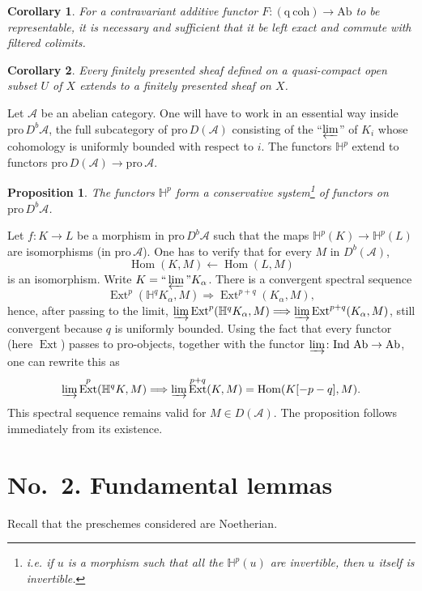 \documentclass[11pt]{amsart}
\DeclareMathOperator{\Hom}{Hom}
\DeclareMathOperator{\Ext}{Ext}
\newcommand{\Ind}{\text{Ind}\,}
\newcommand{\Pro}{\text{pro}\,}
\newcommand{\Ab}{\text{Ab}}
\newcommand{\cA}{\mathcal{A}}
\newcommand{\cDb}{D^{b}}
\newcommand{\cD}{D}
\newcommand{\bH}{\mathbb{H}}
\theoremstyle{plain}
\newtheorem{prop}{Proposition}
\newtheorem{cor}{Corollary}
\theoremstyle{definition}
\begin{document}
\begin{cor}
For a contravariant additive functor $F\colon (\mathrm{q\ coh})\to \Ab$ to be representable, it is necessary and sufficient that it be left exact and commute with filtered colimits.
\end{cor}

\begin{cor}
Every finitely presented sheaf defined on a quasi-compact open subset $U$ of $X$ extends to a finitely presented sheaf on $X$.
\end{cor}

\medskip

Let $\cA$ be an abelian category. One will have to work in an essential way inside $\Pro\cDb\cA$, the full subcategory of $\Pro\cD(\cA)$ consisting of the ``$\varprojlim$'' of $K_i$ whose cohomology is uniformly bounded with respect to $i$. The functors $\bH^p$ extend to functors $\Pro\cD(\cA)\to \Pro\cA$.

\begin{prop}
The functors $\bH^p$ form a conservative system\footnote{i.e. if $u$ is a morphism such that all the $\bH^p(u)$ are invertible, then $u$ itself is invertible.} of functors on $\Pro\cDb\cA$.
\end{prop}

Let $f\colon K\to L$ be a morphism in $\Pro\cDb\cA$ such that the maps $\bH^p(K)\to \bH^p(L)$ are isomorphisms (in $\Pro\cA$). One has to verify that for every $M$ in $\cDb(\cA)$,
\[
\Hom(K,M)\longleftarrow \Hom(L,M)
\]
is an isomorphism. Write $K=\text{``}\varprojlim\text{''}K_\alpha$. There is a convergent spectral sequence
\[
\Ext^p(\bH^q K_\alpha,M) \Longrightarrow \Ext^{p+q}(K_\alpha,M),
\]
hence, after passing to the limit, $\varinjlim \Ext^p(\bH^qK_\alpha,M)\Longrightarrow \varinjlim \Ext^{p+q}(K_\alpha,M)$, still convergent because $q$ is uniformly bounded. Using the fact that every functor (here $\Ext$) passes to pro-objects, together with the functor $\varinjlim\colon \Ind\,\Ab\to\Ab$, one can rewrite this as
\[
\varinjlim \Ext^p(\bH^qK,M) \Longrightarrow \varinjlim \Ext^{p+q}(K,M)=\Hom(K[-p-q],M).
\]
This spectral sequence remains valid for $M\in\cD(\cA)$. The proposition follows immediately from its existence.

\section*{No.~2. Fundamental lemmas}

Recall that the preschemes considered are Noetherian.
\end{document}
